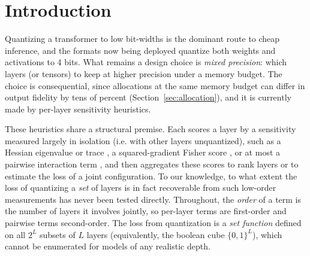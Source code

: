 

\section{Introduction}\label{sec:intro}

Quantizing a transformer to low bit-widths is the dominant route to cheap inference, and the formats now
being deployed quantize both weights and activations to 4 bits. What remains a design choice is
\textit{mixed precision}: which layers (or tensors) to keep at higher precision under a memory budget. The
choice is consequential, since allocations at the same memory budget can differ in output fidelity by tens
of percent (Section~\ref{sec:allocation}), and it is currently made by per-layer sensitivity heuristics.

These heuristics share a structural premise. Each scores a layer by a sensitivity measured largely in
isolation (i.e. with other layers unquantized), such as a Hessian eigenvalue or trace \citep[HAWQ;][]{hawq2019,dong2020hawqv2}, a
squared-gradient Fisher score \citep[ModelOpt;][]{modelopt}, or at most a pairwise interaction term
\citep{clado2023}, and then aggregates these scores to rank layers or to estimate the loss of a joint
configuration. To our knowledge, to what extent the loss of quantizing a \emph{set} of layers is in fact
recoverable from such low-order measurements has never been tested directly. Throughout, the \emph{order}
of a term is the number of layers it involves jointly, so per-layer terms are first-order and pairwise
terms second-order. The loss from quantization is a \emph{set function} defined on all $2^L$ subsets of $L$
layers (equivalently, the boolean cube $\{0,1\}^L$), which cannot be enumerated for models of any realistic depth.

